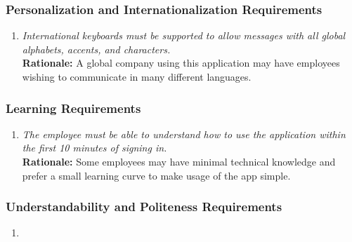 \documentclass[]{article}
\begin{document}
\begin{enumerate}[{\bf BE1.}]
\subsubsection{Personalization and Internationalization Requirements}
\label{ssub:personalization_and_internationalization_requirements}
\begin{enumerate}[{UH-PI}1. ]
    \item \emph{International keyboards must be supported to allow messages with all global alphabets, accents, and characters.}\\
    {\bf Rationale:} A global company using this application may have employees wishing to communicate in many different languages.
\end{enumerate}


\subsubsection{Learning Requirements}
\label{ssub:learning_requirements}
\begin{enumerate}[{UH-L}1. ]
    \item \emph{The employee must be able to understand how to use the application within the first 10 minutes of signing in.}\\
        {\bf Rationale:} Some employees may have minimal technical knowledge and prefer a small learning curve to make usage of the app simple.
\end{enumerate}




\subsubsection{Understandability and Politeness Requirements}
\label{ssub:understandability_and_politeness_requirements}
\begin{enumerate}[{N/A} ]
    \item
\end{enumerate}



\end{enumerate}
\end{document}
